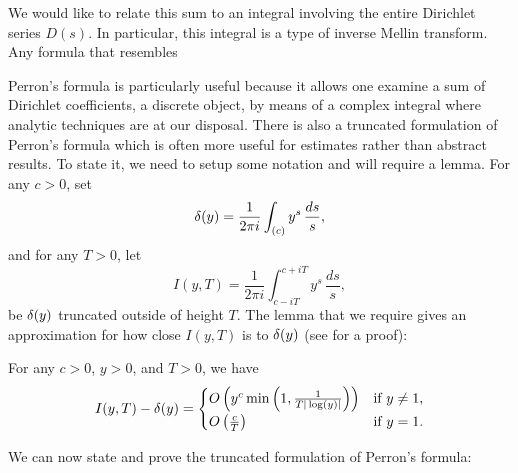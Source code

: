       We would like to relate this sum to an integral involving the entire Dirichlet series $D(s)$. In particular, this integral is a type of inverse Mellin transform. Any formula that resembles  

      Perron's formula is particularly useful because it allows one examine a sum of Dirichlet coefficients, a discrete object, by means of a complex integral where analytic techniques are at our disposal. There is also a truncated formulation of Perron's formula which is often more useful for estimates rather than abstract results. To state it, we need to setup some notation and will require a lemma. For any $c > 0$, set
      \[
        \delta(y) = \frac{1}{2\pi i}\int_{(c)}y^{s}\,\frac{ds}{s},
      \]
      and for any $T > 0$, let
      \[
        I(y,T) = \frac{1}{2\pi i}\int_{c-iT}^{c+iT}y^{s}\,\frac{ds}{s},
      \]
      be $\delta(y)$ truncated outside of height $T$. The lemma that we require gives an approximation for how close $I(y,T)$ is to $\delta(y)$ (see \cite{davenport2013multiplicative} for a proof):

      \begin{lemma}\label{lem:delta_truncation_estimate}
        For any $c > 0$, $y > 0$, and $T > 0$, we have
        \[
          I(y,T)-\delta(y) = \begin{cases} O\left(y^{c}\min\left(1,\frac{1}{T|\log(y)|}\right)\right) & \text{if $y \neq 1$}, \\ O\left(\frac{c}{T}\right) & \text{if $y = 1$}. \end{cases}
        \]
      \end{lemma}

      We can now state and prove the truncated formulation of Perron's formula:

